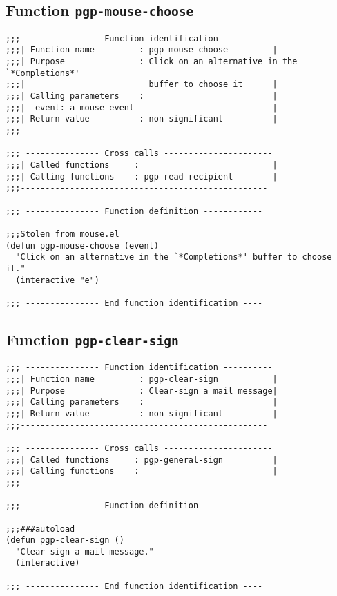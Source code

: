 \subsection{Function {\tt pgp-mouse-choose}}
\leavevmode
\begin{verbatim}
;;; --------------- Function identification ----------
;;;| Function name         : pgp-mouse-choose         |
;;;| Purpose               : Click on an alternative in the `*Completions*'
;;;|                         buffer to choose it      |
;;;| Calling parameters    :                          |
;;;|  event: a mouse event                            |
;;;| Return value          : non significant          |
;;;--------------------------------------------------

;;; --------------- Cross calls ----------------------
;;;| Called functions     :                           |
;;;| Calling functions    : pgp-read-recipient        |
;;;--------------------------------------------------

;;; --------------- Function definition ------------

;;;Stolen from mouse.el
(defun pgp-mouse-choose (event)
  "Click on an alternative in the `*Completions*' buffer to choose it."
  (interactive "e")

;;; --------------- End function identification ----
\end{verbatim}
\subsection{Function {\tt pgp-clear-sign}}
\leavevmode
\begin{verbatim}
;;; --------------- Function identification ----------
;;;| Function name         : pgp-clear-sign           |
;;;| Purpose               : Clear-sign a mail message|
;;;| Calling parameters    :                          |
;;;| Return value          : non significant          |
;;;--------------------------------------------------

;;; --------------- Cross calls ----------------------
;;;| Called functions     : pgp-general-sign          |
;;;| Calling functions    :                           |
;;;--------------------------------------------------

;;; --------------- Function definition ------------

;;;###autoload
(defun pgp-clear-sign ()
  "Clear-sign a mail message."
  (interactive)

;;; --------------- End function identification ----
\end{verbatim}
